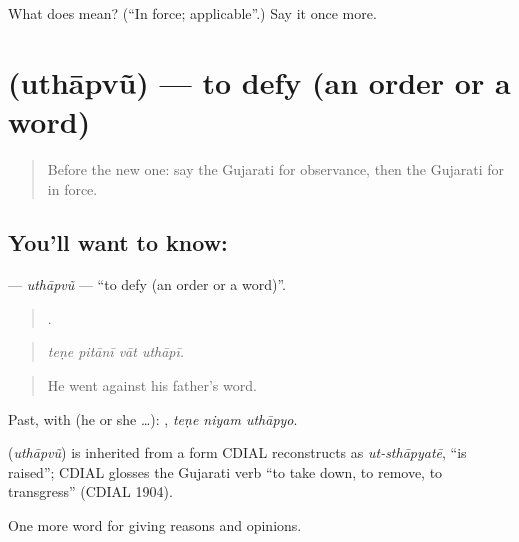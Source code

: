 \begin{tcolorbox}[breakable,colback=teal!4,colframe=teal!35!black,title={Before you move on}]
What does  mean? (\textquotedblleft{}In force; applicable\textquotedblright{}.) Say it once more.
\end{tcolorbox}
\section[\texorpdfstring{\gu{ઉથાપવું} (uthāpvũ)}{ઉથાપવું (uthāpvũ)}]{ (uthāpvũ) — to defy (an order or a word)}

\label{lesson:GU-C347-uthapvu}



\begin{quote}
Before the new one: say the Gujarati for observance, then the Gujarati for in force.
\end{quote}

\subsection*{You'll want to know: }
\textbf{} — \emph{uthāpvũ} — \textquotedblleft{}to defy (an order or a word)\textquotedblright{}.

\begin{quote}
   .
\end{quote}

\begin{quote}
\emph{teṇe pitānī vāt uthāpī.}
\end{quote}

\begin{quote}
He went against his father's word.
\end{quote}

Past, with  (he or she …):   , \emph{teṇe niyam uthāpyo}.

\begin{cousinweb}
\textbf{} (\emph{uthāpvũ}) is inherited from a form CDIAL reconstructs as \emph{ut-sthāpyatē}, \textquotedblleft{}is raised\textquotedblright{}; CDIAL glosses the Gujarati verb \textquotedblleft{}to take down, to remove, to transgress\textquotedblright{} (CDIAL 1904).
\end{cousinweb}

\begin{grammarlens}[title={What you've built}]
One more word for giving reasons and opinions.
\end{grammarlens}

